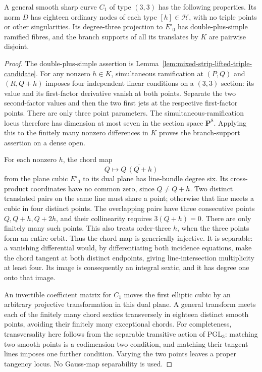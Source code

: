 \begin{lemma}
\label{lem:mixed-odd-all-translated-small-source-candidate}
A general smooth sharp curve $C_1$ of type $(3,3)$ has the following
properties. Its norm $D$ has eighteen ordinary nodes of each type
$[h]\in\mathcal H$, with no triple points or other singularities.
Its degree-three projection to $E'_0$ has double-plus-simple ramified
fibres, and the branch supports of all its translates by $K$ are
pairwise disjoint.
\end{lemma}
\begin{proof}
The double-plus-simple assertion is
Lemma~\ref{lem:mixed-strip-lifted-triple-candidate}.
For any nonzero $h\in K$, simultaneous ramification at
$(P,Q)$ and $(R,Q+h)$ imposes four independent linear conditions
on a $(3,3)$ section: its value and its first-factor derivative
vanish at both points. Separate the two second-factor values and
then the two first jets at the respective first-factor points.
There are only three point parameters. The simultaneous-ramification
locus therefore has dimension at most seven in the section space
$\mathbf P^8$. Applying this to the finitely many nonzero differences
in $K$ proves the branch-support assertion on a dense open.

For each nonzero $h$, the chord map
\[
 Q\longmapsto \overline{Q\,(Q+h)}
\]
from the plane cubic $E'_0$ to its dual plane has line-bundle degree
six. Its cross-product coordinates have no common zero, since
$Q\ne Q+h$. Two distinct translated pairs on the same line must
share a point; otherwise that line meets a cubic in four distinct
points. The overlapping pairs have three consecutive points
$Q,Q+h,Q+2h$, and their collinearity requires $3(Q+h)=0$.
There are only finitely many such points. This also treats order-three
$h$, when the three points form an entire orbit. Thus the chord map
is generically injective. It is separable: a vanishing differential
would, by differentiating both incidence equations, make the chord
tangent at both distinct endpoints, giving line-intersection
multiplicity at least four. Its image is consequently an integral
sextic, and it has degree one onto that image.

An invertible coefficient matrix for $C_1$ moves the first elliptic
cubic by an arbitrary projective transformation in this dual plane.
A general transform meets each of the finitely many chord sextics
transversely in eighteen distinct smooth points, avoiding their
finitely many exceptional chords. For completeness, transversality
here follows from the separable transitive action of
$\mathrm{PGL}_3$: matching two smooth points is a codimension-two
condition, and matching their tangent lines imposes one further
condition. Varying the two points leaves a proper tangency locus.
No Gauss-map separability is used.


\end{proof}
